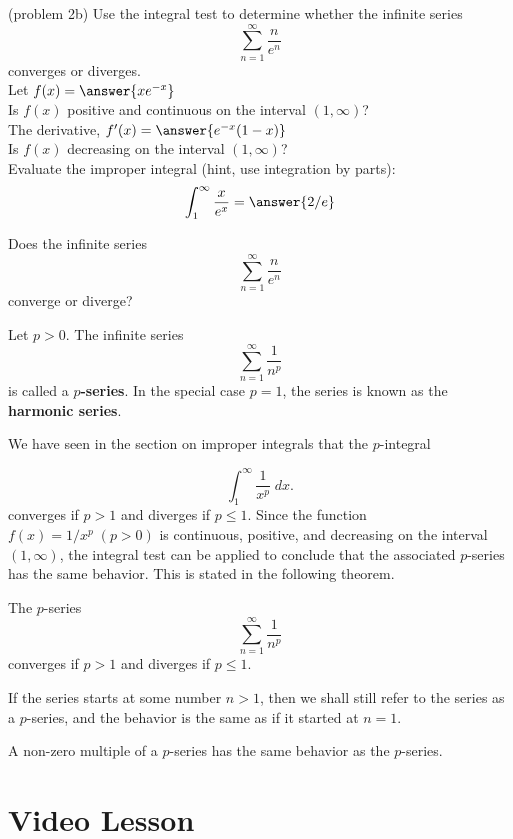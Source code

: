 \documentclass{ximera}
\begin{document}
\begin{problem}(problem 2b)
Use the integral test to determine whether the infinite series
\[
\sum_{n=1}^\infty \frac{n}{e^n}
\]
converges or diverges.\\

Let $f(x) = \answer{xe^{-x}}$\\

Is $f(x)$ positive and continuous on the interval $(1, \infty)$?\\ %

The derivative, $f'(x) = \answer{e^{-x}(1-x)}$\\

Is $f(x)$ decreasing on the interval $(1, \infty)$? \\


Evaluate the improper integral (hint, use integration by parts): 
\[
 \int_1^\infty \frac{x}{e^x} = \answer{2/e}
\]

Does the infinite series
\[
\sum_{n=1}^\infty \frac{n}{e^n}
\]
converge or diverge? 


\end{problem}


\begin{definition}[p-series]
Let $p > 0$. The infinite series
\[
\sum_{n=1}^\infty \frac{1}{n^p}
\]
is called a \textbf{$p$-series}. In the special case $p = 1$, the series is known as the \textbf{harmonic series}.
\end{definition}

We have seen in the section on improper integrals that the $p$-integral

\[
\int_1^\infty \frac{1}{x^p} \; dx.
\]
converges if $p > 1$ and diverges if $p \leq 1$.
Since the function $f(x) = 1/x^p \; (p > 0)$ is continuous, positive, and decreasing on the interval $(1, \infty)$,
the integral test can be applied to conclude that the associated $p$-series has the same behavior.  This is stated in the following theorem.


\begin{theorem}[$p$-series]
The $p$-series
\[
\sum_{n=1}^\infty \frac{1}{n^p}
\]
converges if $p > 1$ and diverges if $p \leq 1$.
\end{theorem}

\begin{remark}
If the series starts at some number $n >1$, then we shall still refer to the 
series as a $p$-series, and the behavior is the same as if it started at $n=1$.
\end{remark}

\begin{remark}
A non-zero multiple of a $p$-series has the same behavior as the $p$-series.
\end{remark}

\section{Video Lesson}

\begin{center}
\begin{foldable}
\end{foldable}
\end{center}
\end{document}
